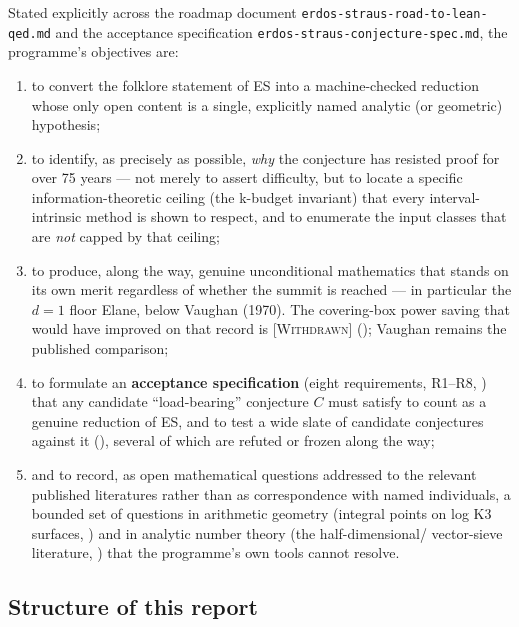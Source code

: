\documentclass[11pt]{article}
\theoremstyle{plain}
\theoremstyle{definition}
\theoremstyle{remark}
\newcommand{\WITHDRAWN}{\textcolor{negative}{\textsc{[Withdrawn]}}}
\renewcommand{\_}{\textunderscore\allowbreak}
\begin{document}
Stated explicitly across the roadmap document \texttt{erdos-\allowbreak straus-\allowbreak road-\allowbreak to-\allowbreak lean-\allowbreak qed.md} and the
acceptance specification \texttt{erdos-\allowbreak straus-\allowbreak conjecture-\allowbreak spec.md}, the programme's objectives are:
\begin{enumerate}[leftmargin=1.6em]
  \item to convert the folklore statement of ES into a machine-checked reduction whose only
        open content is a single, explicitly named analytic (or geometric) hypothesis;
  \item to identify, as precisely as possible, \emph{why} the conjecture has resisted proof for
        over 75 years — not merely to assert difficulty, but to locate a specific
        information-theoretic ceiling (the k-budget invariant) that every interval-intrinsic
        method is shown to respect, and to enumerate the input classes that are \emph{not}
        capped by that ceiling;
  \item to produce, along the way, genuine unconditional mathematics that stands on its own
        merit regardless of whether the summit is reached — in particular the \(d=1\) floor
        E\_lane, below Vaughan (1970). The covering-box power saving that would have improved
        on that record is \WITHDRAWN{} (); Vaughan remains the published
        comparison;
  \item to formulate an \textbf{acceptance specification} (eight requirements, R1--R8,
        ) that any candidate ``load-bearing'' conjecture $C$ must satisfy to
        count as a genuine reduction of ES, and to test a wide slate of candidate conjectures
        against it (), several of which are refuted or frozen along the
        way;
  \item and to record, as open mathematical questions addressed to the relevant published
        literatures rather than as correspondence with named individuals, a bounded set of
        questions in arithmetic geometry (integral points on log K3 surfaces,
        ) and in analytic number theory (the half-dimensional/
        vector-sieve literature, ) that the programme's own tools cannot
        resolve.
\end{enumerate}

\subsection{Structure of this report}
\end{document}
